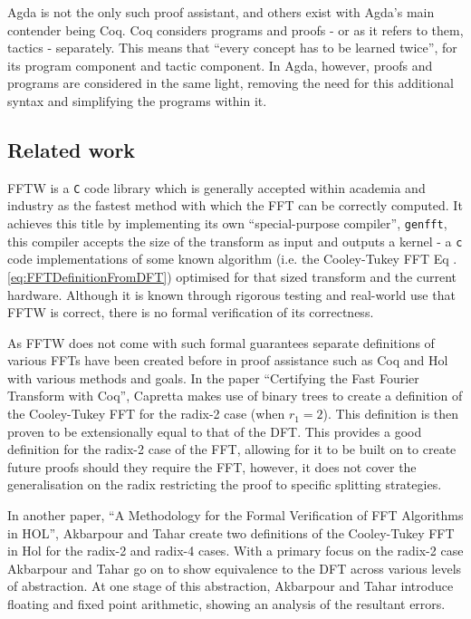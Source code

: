 Agda is not the only such proof assistant, and others exist with Agda's main 
contender being Coq.
Coq considers programs and proofs - or as it refers to them, tactics - 
separately.
This means that ``every concept has to be learned twice''\cite{PLFA}, for its 
program component and tactic component. \cite{Barras1999}
In Agda, however, proofs and programs are considered in the same light, removing
the need for this additional syntax and simplifying the programs within it.

\subsection{Related work}
FFTW\cite{Frigo2005} is a \verb|C| code library which is generally accepted within academia and industry as the fastest method with which the FFT can be correctly computed.\cite{Frigo1999} 
It achieves this title by implementing its own ``special-purpose compiler''\cite{Frigo1999}, \verb|genfft|, this compiler accepts the size of the transform as input and outputs a kernel - a \verb|c| code implementations of some known algorithm (i.e. the Cooley-Tukey FFT \cite{Cooley1965} Eq .\ref{eq:FFTDefinitionFromDFT}) optimised for that sized transform and the current hardware.\cite{Frigo1999} 
Although it is known through rigorous testing and real-world use that FFTW is correct, there is no formal verification of its correctness. %

As FFTW does not come with such formal guarantees 
separate definitions of various FFTs have been created before in proof assistance such as Coq\cite{Barras1999} and Hol\cite{Gordon1993} with various methods and goals. In the paper ``Certifying the Fast Fourier Transform with Coq''\cite{Capretta2001}, Capretta makes use of binary trees to create a definition of the Cooley-Tukey FFT\cite{Cooley1965} for the radix-2 case (when $r_1=2$).
This definition is then proven to be extensionally equal to that of the DFT.
This provides a good definition for the radix-2 case of the FFT, allowing for it to be built on to create future proofs should they require the FFT, however, it does not cover the generalisation on the radix restricting the proof to specific splitting strategies.

In another paper, ``A Methodology for the Formal Verification of FFT Algorithms in 
HOL'',\cite{Akbarpour2004} Akbarpour and Tahar create two definitions of the 
Cooley-Tukey FFT\cite{Cooley1965} in Hol for the radix-2 and radix-4 cases.
With a primary focus on the radix-2 case Akbarpour and Tahar go on to show 
equivalence to the DFT across various levels of abstraction.\cite{Akbarpour2004}
At one stage of this abstraction, Akbarpour and Tahar introduce floating and 
fixed point arithmetic, showing an analysis of the resultant errors.\cite{Akbarpour2004}

